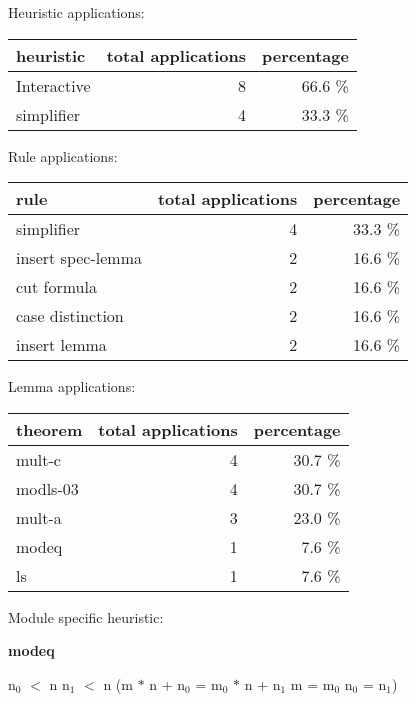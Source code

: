 \documentclass[a4paper]{article}
\begin{document}
\medskip


Heuristic applications:

\begin{supertabular}{l|r|r}
heuristic	& total applications & percentage \\ \hline
Interactive & 8 & 66.6 \% \\
simplifier & 4 & 33.3 \% \\

\end{supertabular}

Rule applications:

\begin{supertabular}{l|r|r}
rule	        & total applications & percentage \\ \hline
simplifier & 4 & 33.3 \% \\
insert spec-lemma & 2 & 16.6 \% \\
cut formula & 2 & 16.6 \% \\
case distinction & 2 & 16.6 \% \\
insert lemma & 2 & 16.6 \% \\

\end{supertabular}

Lemma applications:

\begin{supertabular}{l|r|r}
theorem	        & total applications & percentage \\ \hline
mult-c & 4 & 30.7 \% \\
modls-03 & 4 & 30.7 \% \\
mult-a & 3 & 23.0 \% \\
modeq & 1 & 7.6 \% \\
ls & 1 & 7.6 \% \\

\end{supertabular}

Module specific heuristic:

\pagebreak

{\LARGE\bf modeq}\label{lemma-modeq}

\medskip

 \Fol $\mbox{n}_{0}$ $<$ n \And $\mbox{n}_{1}$ $<$ n \Imp (m $*$ n + $\mbox{n}_{0}$ = $\mbox{m}_{0}$ $*$ n + $\mbox{n}_{1}$ \Equiv m = $\mbox{m}_{0}$ \And $\mbox{n}_{0}$ = $\mbox{n}_{1}$)
\end{document}
